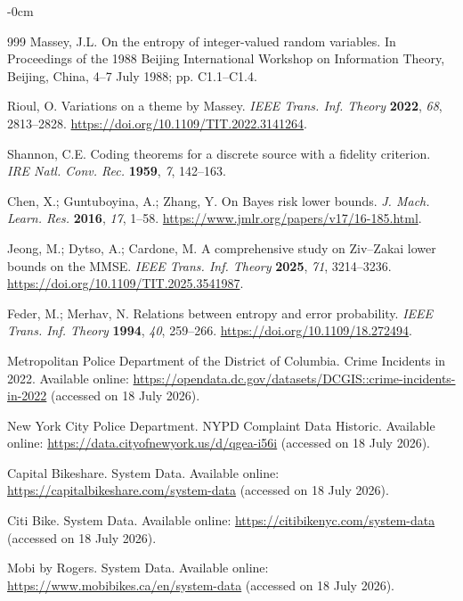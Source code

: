 \documentclass[applsci,article,accept,moreauthors]{Definitions/mdpi}
\begin{document}
\begin{adjustwidth}{-\extralength}{0cm}
\begin{thebibliography}{999}
Massey, J.L. On the entropy of integer-valued random variables. In
{Proceedings of the 1988 Beijing International Workshop on Information
Theory}, Beijing, China, 4--7 July 1988; pp. C1.1--C1.4.

Rioul, O. Variations on a theme by Massey.
\emph{IEEE Trans. Inf. Theory} \textbf{2022}, \emph{68}, 2813--2828.
\url{https://doi.org/10.1109/TIT.2022.3141264}.

Shannon, C.E. Coding theorems for a discrete source with a fidelity
criterion. \emph{IRE Natl. Conv. Rec.} \textbf{1959}, \emph{7},
142--163.

Chen, X.; Guntuboyina, A.; Zhang, Y. On Bayes risk lower bounds.
\emph{J. Mach. Learn. Res.} \textbf{2016}, \emph{17}, 1--58.
\url{https://www.jmlr.org/papers/v17/16-185.html}.

Jeong, M.; Dytso, A.; Cardone, M. A comprehensive study on Ziv--Zakai
lower bounds on the MMSE. \emph{IEEE Trans. Inf. Theory} \textbf{2025},
\emph{71}, 3214--3236.
\url{https://doi.org/10.1109/TIT.2025.3541987}.


Feder, M.; Merhav, N. Relations between entropy and error probability.
\emph{IEEE Trans. Inf. Theory} \textbf{1994}, \emph{40}, 259--266.
\url{https://doi.org/10.1109/18.272494}.



Metropolitan Police Department of the District of Columbia. Crime
Incidents in 2022. Available online:
\url{https://opendata.dc.gov/datasets/DCGIS::crime-incidents-in-2022}
(accessed on 18 July 2026).

New York City Police Department. NYPD Complaint Data Historic.
Available online:
\url{https://data.cityofnewyork.us/d/qgea-i56i}
(accessed on 18 July 2026).


Capital Bikeshare. System Data. Available online:
\url{https://capitalbikeshare.com/system-data}
(accessed on 18 July 2026).

Citi Bike. System Data. Available online:
\url{https://citibikenyc.com/system-data}
(accessed on 18 July 2026).

Mobi by Rogers. System Data. Available online:
\url{https://www.mobibikes.ca/en/system-data}
(accessed on 18 July 2026).


\end{thebibliography}
\end{adjustwidth}
\end{document}
